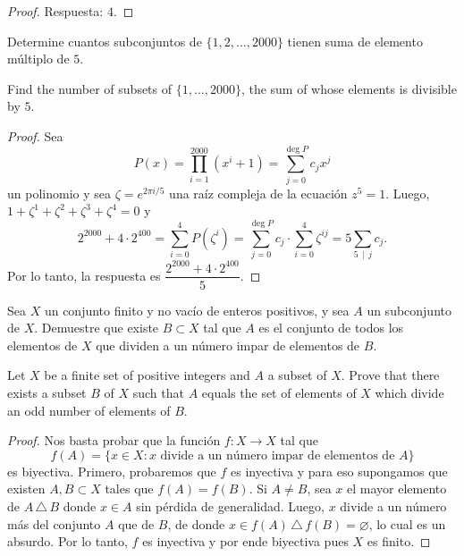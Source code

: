 \begin{proof}
  Respuesta: $4$.
\end{proof}

\begin{probMR}[%
    High-School Mathematics 1994/1, China \cite{ref:titu-102}\protect\footnote{%
      Un video de \href{https://www.youtube.com/c/3blue1brown}{3Blue1Brown}
      cubriendo este problema:
      \url{https://www.youtube.com/watch?v=bOXCLR3Wric}.%
    }%
  ]
  Determine cuantos subconjuntos de $\{1,2,\dots,2000\}$ tienen suma de elemento
  múltiplo de $5$.
  \begin{hint}
    Find the number of subsets of $\{1,\dots,2000\}$, the sum of whose elements
    is divisible by $5$.
  \end{hint}
\end{probMR}

\begin{proof}
  Sea
  \[P(x)=\prod_{i=1}^{2000}(x^i+1)=\sum_{j=0}^{\deg P}c_jx^j\]
  un polinomio y sea $\zeta=e^{2\pi i/5}$ una raíz compleja de la ecuación
  $z^5=1$. Luego, $1+\zeta^1+\zeta^2+\zeta^3+\zeta^4=0$ y
  \[
    2^{2000}+4\cdot 2^{400}
    =\sum_{i=0}^4 P(\zeta^i)
    =\sum_{j=0}^{\deg P}c_j\cdot\sum_{i=0}^4\zeta^{ij}
    =5\sum_{5\,\mid\,j}c_j.
  \]
  Por lo tanto, la respuesta es $\dfrac{2^{2000}+4\cdot 2^{400}}{5}$.
\end{proof}

\begin{probEG}[MOSP 1999]
  Sea $X$ un conjunto finito y no vacío de enteros positivos, y sea $A$ un
  subconjunto de $X$. Demuestre que existe $B\subset X$ tal que $A$ es el
  conjunto de todos los elementos de $X$ que dividen a un número impar de
  elementos de $B$.
  \begin{hint}
    Let $X$ be a finite set of positive integers and $A$ a subset of $X$. Prove
    that there exists a subset $B$ of $X$ such that $A$ equals the set of
    elements of $X$ which divide an odd number of elements of $B$.
  \end{hint}
\end{probEG}

\begin{proof}
  Nos basta probar que la función $f:X\to X$ tal que
  \[f(A)=\{x\in X:x\text{ divide a un número impar de elementos de }A\}\]
  es biyectiva. Primero, probaremos que $f$ es inyectiva y para eso supongamos
  que existen $A,B\subset X$ tales que $f(A)=f(B)$. Si $A\ne B$, sea $x$ el
  mayor elemento de $A\,\triangle\,B$ donde $x\in A$ sin pérdida de generalidad.
  Luego, $x$ divide a un número más del conjunto $A$ que de $B$, de donde
  $x\in f(A)\,\triangle\,f(B)=\varnothing$, lo cual es un absurdo. Por lo tanto,
  $f$ es inyectiva y por ende biyectiva pues $X$ es finito.
\end{proof}


